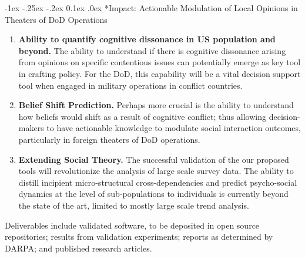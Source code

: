\documentclass[onecolumn, compsoc,11pt]{IEEEtran}
\makeatletter
\renewcommand\subsection{\@startsection {section}{1}{\z@}%
  {-1ex \@plus -.25ex \@minus -.2ex}%
  {0.1ex \@plus.0ex}%
  {\fontsize{11}{10}\selectfont\bfseries\sffamily\color{DodgerBlue4}}}
\newcommand{\tball}[1][CadetBlue4]{${\color{#1}\Large\boldsymbol{\blacksquare}}$}
\makeatother
\begin{document}
\subsection*{Impact: Actionable Modulation of Local Opinions  in Theaters of DoD Operations}
\begin{enumerate}
  [label=\tball, leftmargin=0pt,
  labelindent=0em, topsep=0.1em, labelsep=*, itemsep=.15em,itemindent=2em]\color{black} \sffamily\fontsize{11}{12}\selectfont
\item  \textbf{Ability to quantify cognitive dissonance in US population and beyond.}  The ability to understand if there is cognitive dissonance arising from opinions on specific contentious  issues can potentially emerge as key tool in crafting policy. For the DoD, this capability will be a vital decision support tool when engaged in military  operations in conflict countries.
\item  \textbf{Belief Shift Prediction.} Perhaps more crucial is the ability to understand how beliefs would shift as a result of cognitive conflict; thus allowing decision-makers to have actionable knowledge to modulate social interaction outcomes, particularly in foreign theaters  of DoD operations.
\item \textbf{Extending Social Theory.} The successful validation of the our proposed tools will revolutionize the analysis of large scale survey data. The ability to distill incipient micro-structural  cross-dependencies and predict psycho-social dynamics at the level of sub-populations to individuals is currently beyond the state of the art, limited to mostly large scale trend analysis.
\end{enumerate}
Deliverables include validated software, to be deposited in open source repositories; results from validation experiments; reports as determined by DARPA; and published research articles.



\end{document}
